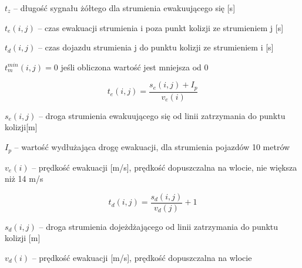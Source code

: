 \begin{math} t_{z} \end{math} \textrm{ -- długość sygnału żółtego dla strumienia ewakuującego się [s]}

\begin{math} t_{e} (i,j) \end{math} \textrm{ -- czas ewakuacji strumienia i poza punkt kolizji ze strumieniem j [s]}

\begin{math} t_{d} (i,j) \end{math} \textrm{ -- czas dojazdu strumienia j do punktu kolizji ze strumieniem i [s]}

\begin{math} t^{min}_{m} (i,j) = 0 \end{math} \textrm{ jeśli obliczona wartość jest mniejsza od 0}

\begin{equation}
	t_{e} (i,j) = \frac{s_{e} (i,j) + I_p}{v_{e} (i)}
\end{equation}

\begin{math} s_{e} (i,j) \end{math} \textrm{ -- droga strumienia ewakuującego się od linii zatrzymania do punktu kolizji[m]}

\begin{math} I_p \end{math} \textrm{ -- wartość wydłużająca drogę ewakuacji, dla strumienia pojazdów 10 metrów}

\begin{math} v_{e} (i) \end{math} \textrm{ -- prędkość ewakuacji [m/s], prędkość dopuszczalna na wlocie, nie większa niż 14 m/s}

\begin{equation}
	t_{d} (i,j) = \frac{s_{d} (i,j)}{v_{d} (j)} + 1
\end{equation}

\begin{math} s_{d} (i,j) \end{math} \textrm{ -- droga strumienia dojeżdżającego od linii zatrzymania do punktu kolizji [m]}

\begin{math} v_{d} (i) \end{math} \textrm{ -- prędkość ewakuacji [m/s], prędkość dopuszczalna na wlocie}